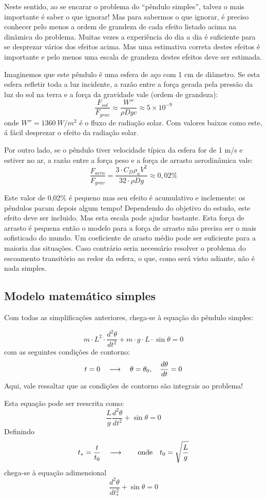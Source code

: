 Neste sentido, ao se encarar o problema do ``pêndulo simples'', talvez o mais importante é saber o que ignorar! Mas para sabermos o que ignorar, é preciso conhecer pelo menos a ordem de grandeza de cada efeito listado acima na dinâmica do problema. Muitas vezes a experiência do dia a dia é suficiente para se desprezar vários dos efeitos acima. Mas uma estimativa correta destes efeitos é importante e pelo menos uma escala de grandeza destes efeitos deve ser estimada.

Imaginemos que este pêndulo é uma esfera de aço com 1 cm de diâmetro. Se esta esfera refletir toda a luz incidente, a razão entre a força gerada pela pressão da luz do sol na terra e a força da gravidade vale (ordem de grandeza):
\[
\frac{F_{sol}}{F_{grav}} \approx \frac{W''}{\rho D g c} \approx 5\times 10^{-9}
\]
onde $W''=1360\:W/m^2$ é o fluxo de radiação solar. Com valores baixos como este, á fácil desprezar o efeito da radiação solar. 

Por outro lado, se o pêndulo tiver velocidade típica da esfera for de 1 m/s e estiver no ar, a razão entre a força peso e a força de arrasto aerodinâmica vale:
\[
\frac{F_{aero}}{F_{grav}} = \frac{3\cdot C_D \rho_a V^2}{32\cdot\rho D g} \approx 0,02\%
\]

Este valor de 0,02\% é pequeno mas seu efeito é acumulativo e inclemente: os pêndulos param depois algum tempo! Dependendo do objetivo do estudo, este efeito deve ser incluido. Mas esta escala pode ajudar bastante. Esta força de arrasto é pequena então o modelo para a força de arrasto não precisa ser o mais sofisticado do mundo. Um coeficiente de arasto médio pode ser suficiente para a maioria das situações. Caso contrário seria necessário resolver o problema do escoamento transitório ao redor da esfera, o que, como será visto adiante, não é nada simples.

\subsection{Modelo matemático simples}
Com todas as simplificações anteriores, chega-se à equação do pêndulo simples:

\[
m\cdot L^2\cdot\frac{d^2\theta}{dt^2} + m\cdot g\cdot L\cdot \sin\theta = 0
\]
com as seguintes condições de contorno:
\[
t = 0 \quad\longrightarrow\quad \theta=\theta_0, \quad\frac{d\theta}{dt} = 0
\]
Aqui, vale ressaltar que as condições de contorno são integrais ao problema!

Esta equação pode ser reescrita como:
\[
\frac{L}{g}\frac{d^2\theta}{dt^2} + \sin\theta = 0 
\]
Definindo 
\[
t_* = \frac{t}{t_0}\quad\longrightarrow\quad \quad\text{onde}\quad t_0 = \sqrt{\frac{L}{g}}
\]
chega-se à equação adimensional
\[
\frac{d^2\theta}{dt_*^2} + \sin\theta = 0 
\]

